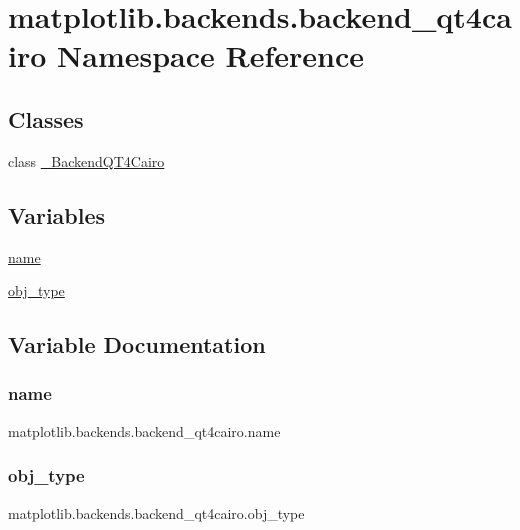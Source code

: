 \hypertarget{namespacematplotlib_1_1backends_1_1backend__qt4cairo}{}\section{matplotlib.\+backends.\+backend\+\_\+qt4cairo Namespace Reference}
\label{namespacematplotlib_1_1backends_1_1backend__qt4cairo}
\subsection*{Classes}
\begin{DoxyCompactItemize}
\item 
class \hyperlink{classmatplotlib_1_1backends_1_1backend__qt4cairo_1_1__BackendQT4Cairo}{\+\_\+\+Backend\+Q\+T4\+Cairo}
\end{DoxyCompactItemize}
\subsection*{Variables}
\begin{DoxyCompactItemize}
\item 
\hyperlink{namespacematplotlib_1_1backends_1_1backend__qt4cairo_ae042bae4ad548f4b7e3d0cf6613aeb75}{name}
\item 
\hyperlink{namespacematplotlib_1_1backends_1_1backend__qt4cairo_a2b7127f27c42e4d6b1148475e6e8968b}{obj\+\_\+type}
\end{DoxyCompactItemize}


\subsection{Variable Documentation}
\mbox{\label{namespacematplotlib_1_1backends_1_1backend__qt4cairo_ae042bae4ad548f4b7e3d0cf6613aeb75}} 
\subsubsection{\texorpdfstring{name}{name}}
{\footnotesize\ttfamily matplotlib.\+backends.\+backend\+\_\+qt4cairo.\+name}

\mbox{\label{namespacematplotlib_1_1backends_1_1backend__qt4cairo_a2b7127f27c42e4d6b1148475e6e8968b}} 
\subsubsection{\texorpdfstring{obj\+\_\+type}{obj\_type}}
{\footnotesize\ttfamily matplotlib.\+backends.\+backend\+\_\+qt4cairo.\+obj\+\_\+type}

